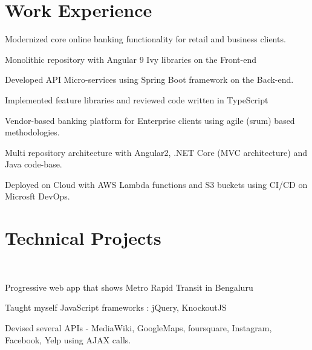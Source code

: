\documentclass[]{deedy-resume-openfont}
\begin{document}
\begin{minipage}[t]{0.66\textwidth} 


\section{Work Experience}
\vspace{\topsep} %
\begin{tightemize}
\item Modernized core online banking functionality for retail and business clients.
\item Monolithic repository with Angular 9 Ivy libraries on the Front-end
\item Developed API Micro-services using Spring Boot framework on the Back-end. 
\item Implemented feature libraries and reviewed code written in TypeScript
\end{tightemize}
\sectionsep
{}
\begin{tightemize}
\item Vendor-based banking platform for Enterprise clients using agile (srum) based methodologies.
\item Multi repository architecture with Angular2, .NET Core (MVC architecture) and Java code-base.
\item Deployed on Cloud with AWS Lambda functions and S3 buckets using CI/CD on Microsft DevOps.
\end{tightemize}
\sectionsep



\section{Technical Projects}
\\
\begin{tightemize}
\item Progressive web app that shows Metro Rapid Transit in Bengaluru
\item Taught myself JavaScript frameworks : jQuery, KnockoutJS
\item Devised several APIs - MediaWiki, GoogleMaps, foursquare, Instagram, Facebook, Yelp using AJAX calls.  
\end{tightemize}
\sectionsep


\end{minipage}
\end{document}
